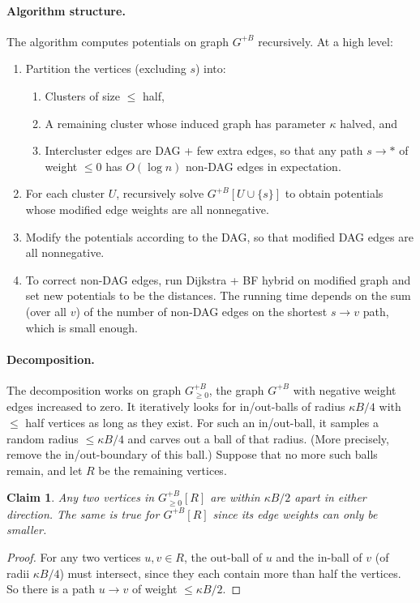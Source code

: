 \documentclass{article}
\newtheorem{claim}[theorem]{Claim}
\begin{document}
\paragraph{Algorithm structure.}
The algorithm computes potentials on graph $G^{+B}$ recursively. At a high level:
 \begin{enumerate}
 \item Partition the vertices (excluding $s$) into:
  \begin{enumerate}
  \item Clusters of size $\le$ half,
  \item A remaining cluster whose induced graph has parameter $\kappa$ halved, and
  \item Intercluster edges are DAG + few extra edges, so that any path $s\to *$ of weight $\le0$ has $O(\log n)$ non-DAG edges in expectation.
  \end{enumerate}
 \item For each cluster $U$, recursively solve $G^{+B}[U\cup\{s\}]$ to obtain potentials whose modified edge weights are all nonnegative.
 \item Modify the potentials according to the DAG, so that modified DAG edges are all nonnegative.
 \item To correct non-DAG edges, run Dijkstra + BF hybrid on modified graph and set new potentials to be the distances. The running time depends on the sum (over all $v$) of the number of non-DAG edges on the shortest $s\to v$ path, which is small enough.
 \end{enumerate}

\paragraph{Decomposition.}
The decomposition works on graph $G^{+B}_{\ge0}$, the graph $G^{+B}$ with negative weight edges increased to zero. It iteratively looks for in/out-balls of radius $\kappa B/4$ with $\le$ half vertices as long as they exist. For such an in/out-ball, it samples a random radius $\le\kappa B/4$ and carves out a ball of that radius. (More precisely, remove the in/out-boundary of this ball.) Suppose that no more such balls remain, and let $R$ be the remaining vertices.

\begin{claim}
Any two vertices in $G^{+B}_{\ge0}[R]$ are within $\kappa B/2$ apart in either direction. The same is true for $G^{+B}[R]$ since its edge weights can only be smaller.
\end{claim}
\begin{proof}
For any two vertices $u,v\in R$, the out-ball of $u$ and the in-ball of $v$ (of radii $\kappa B/4$) must intersect, since they each contain more than half the vertices. So there is a path $u\to v$ of weight $\le\kappa B/2$.
\end{proof}
\end{document}

